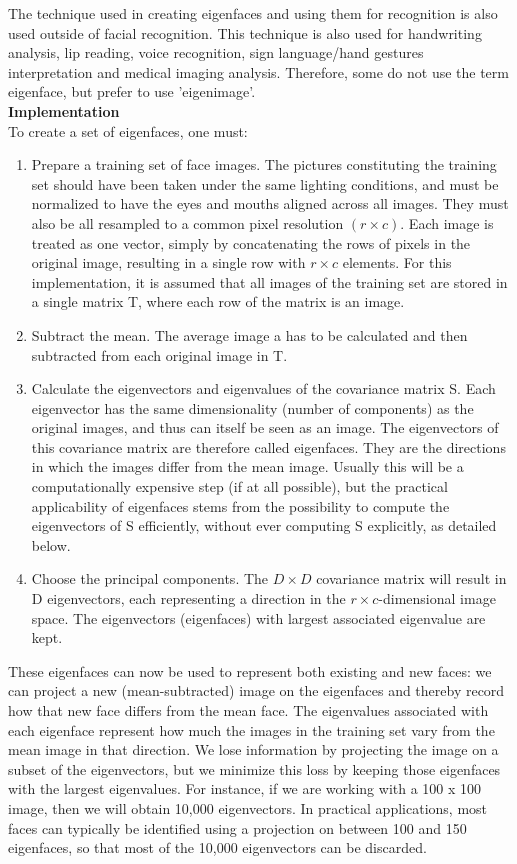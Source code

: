 \documentclass[12pt]{article}			%
\begin{document}
The technique used in creating eigenfaces and using them for recognition is also used outside of facial recognition. This technique is also used for handwriting analysis, lip reading, voice recognition, sign language/hand gestures interpretation and medical imaging analysis. Therefore, some do not use the term eigenface, but prefer to use 'eigenimage'.\\[2ex]
{\bf Implementation}\\
To create a set of eigenfaces, one must:
\begin{enumerate}
\item Prepare a training set of face images. The pictures constituting the training set should have been taken under the same lighting conditions, and must be normalized to have the eyes and mouths aligned across all images. They must also be all resampled to a common pixel resolution $(r \times c)$. Each image is treated as one vector, simply by concatenating the rows of pixels in the original image, resulting in a single row with $r \times c$ elements. For this implementation, it is assumed that all images of the training set are stored in a single matrix T, where each row of the matrix is an image.

\item Subtract the mean. The average image a has to be calculated and then subtracted from each original image in T.

\item Calculate the eigenvectors and eigenvalues of the covariance matrix S. Each eigenvector has the same dimensionality (number of components) as the original images, and thus can itself be seen as an image. The eigenvectors of this covariance matrix are therefore called eigenfaces. They are the directions in which the images differ from the mean image. Usually this will be a computationally expensive step (if at all possible), but the practical applicability of eigenfaces stems from the possibility to compute the eigenvectors of S efficiently, without ever computing S explicitly, as detailed below.

\item Choose the principal components. The $D \times D$ covariance matrix will result in D eigenvectors, each representing a direction in the $r \times c$-dimensional image space. The eigenvectors (eigenfaces) with largest associated eigenvalue are kept.
\end{enumerate}
These eigenfaces can now be used to represent both existing and new faces: we can project a new (mean-subtracted) image on the eigenfaces and thereby record how that new face differs from the mean face. The eigenvalues associated with each eigenface represent how much the images in the training set vary from the mean image in that direction. We lose information by projecting the image on a subset of the eigenvectors, but we minimize this loss by keeping those eigenfaces with the largest eigenvalues. For instance, if we are working with a 100 x 100 image, then we will obtain 10,000 eigenvectors. In practical applications, most faces can typically be identified using a projection on between 100 and 150 eigenfaces, so that most of the 10,000 eigenvectors can be discarded.\\
\end{document}
